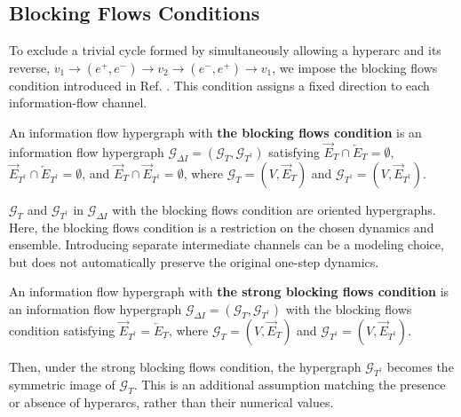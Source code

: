 \documentclass{comnet}%
\begin{document}
\subsection{\label{sec:Identification_Blocking_Condition}Blocking Flows Conditions}
To exclude a trivial cycle formed by simultaneously allowing a hyperarc and its reverse, $v_{1} \to (e^{+}, e^{-}) \to v_{2} \to (e^{-}, e^{+}) \to v_{1}$, we impose the blocking flows condition introduced in Ref. \cite{Lee2026a}. This condition assigns a fixed direction to each information-flow channel.
\begin{definition}
	An information flow hypergraph with \textbf{the blocking flows condition} is an information flow hypergraph $\mathcal{G}_{\Delta I} = (\mathcal{G}_{T}, \mathcal{G}_{T^{\dagger}})$ satisfying $\overrightarrow{E}_{T} \cap \overleftarrow{E}_{T} = \emptyset$, $\overrightarrow{E}_{T^{\dagger}} \cap \overleftarrow{E}_{T^{\dagger}} = \emptyset$, and $\overrightarrow{E}_{T} \cap \overrightarrow{E}_{T^{\dagger}} = \emptyset$, where $\mathcal{G}_{T}=(V, \overrightarrow{E}_{T})$ and $\mathcal{G}_{T^{\dagger}}=(V, \overrightarrow{E}_{T^{\dagger}})$.\\
\end{definition}
$\mathcal{G}_{T}$ and $\mathcal{G}_{T^{\dagger}}$ in $\mathcal{G}_{\Delta I}$ with the blocking flows condition are oriented hypergraphs. Here, the blocking flows condition is a restriction on the chosen dynamics and ensemble. Introducing separate intermediate channels can be a modeling choice, but does not automatically preserve the original one-step dynamics.

\begin{definition}
	An information flow hypergraph with \textbf{the strong blocking flows condition} is an information flow hypergraph $\mathcal{G}_{\Delta I} = (\mathcal{G}_{T}, \mathcal{G}_{T^{\dagger}})$ with the blocking flows condition satisfying $\overrightarrow{E}_{T^{\dagger}} = \overleftarrow{E}_{T}$, where $\mathcal{G}_{T}=(V, \overrightarrow{E}_{T})$ and $\mathcal{G}_{T^{\dagger}}=(V, \overrightarrow{E}_{T^{\dagger}})$.\\
\end{definition}

Then, under the strong blocking flows condition, the hypergraph $\mathcal{G}_{T^{\dagger}}$ becomes the symmetric image of $\mathcal{G}_{T}$. This is an additional assumption matching the presence or absence of hyperarcs, rather than their numerical values.\\
\end{document}
